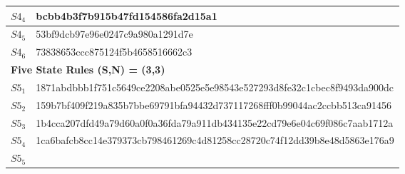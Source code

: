 \documentclass{elsarticle}
\begin{document}
\begin{multicols}{2}
\begin{table}[!htb]
\begin{tabular}{|p{2cm}|l|}
$S4_{4}$ &   bcbb4b3f7b915b47fd154586fa2d15a1\\ \hline
$S4_{5}$ &   53bf9dcb97e96e0247c9a980a1291d7e \\ \hline
$S4_{6}$ &   73838653ccc875124f5b4658516662c3\\
\hline
\multicolumn{2}{|l|}{\textbf{Five State Rules (S,N) = (3,3)}} \\ \hline
 $S5_{1}$ & %
    1871abdbbb1f751c5649ce2208abe0525e5e98543e527293d8fe32c1cbec8f9493da900dc 
    \\
    \hline
    $S5_{2}$ & %
159b7bf409f219a835b7bbe69791bfa94432d737117268fff0b99044ac2ccbb513ca91456 \\
\hline
$S5_{3}$ & %
1b4cca207dfd49a79d60a0f0a36fda79a911db434135e22cd79e6e04c69f086c7aab1712a
\\ \hline
$S5_{4}$  & %
1ca6bafcb8cc14e379373cb798461269c4d81258cc28720c74f12dd39b8e48d5863e176a9
\\ \hline
$S5_{5}$ & %

\end{tabular}
\end{table}
\end{multicols}
\end{document}
